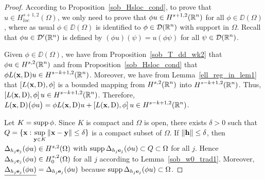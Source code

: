 \begin{proof}
According to Proposition~\ref{sob_Hsloc_cond}, to prove that
$\displaystyle u \in H^{s+1,2}_{loc}(\Omega)$, we only need to prove that
$\displaystyle \phi u \in H^{s+1,2}(\mathbb{R}^n)$ for all $\phi\in \DD(\Omega)$,
where as usual $\phi \in \DD(\Omega)$ is identified to
$\displaystyle \phi \in \mathcal{D}(\mathbb{R}^n)$ with
support in $\Omega$.  Recall that $\phi  u \in \mathcal{D}'(\mathbb{R}^n)$ is
defined by $(\phi u)(\psi) = u(\phi \psi)$ for all
$\displaystyle \psi \in \mathcal{D}(\mathbb{R}^n)$.

Given $\phi \in \DD(\Omega)$, we have from
Proposition~\ref{sob_T_dd_wk2} that $\displaystyle \phi u \in H^{s,2}(\mathbb{R}^n)$
and from Proposition~\ref{sob_Hsloc_cond} that
$\displaystyle \phi L(\mathbf{x},\operatorname{D}) u \in H^{s-k+1,2}(\mathbb{R}^n)$.
Moreover, we have from Lemma~\ref{ell_reg_in_lem1}
that $\left[ L(\mathbf{x},\operatorname{D}), \phi\right]$ is a bounded mapping from
$\displaystyle H^{s,2}(\mathbb{R}^n)$ into $\displaystyle H^{s-k+1,2}(\mathbb{R}^n)$.
Thus,
$\displaystyle \left[ L(\mathbf{x},\operatorname{D}), \phi\right]u \in H^{s-k+1,2}(\mathbb{R}^n)$.
Therefore,
$\displaystyle L(\mathbf{x},\operatorname{D}) \big(\phi u\big) = \phi L(\mathbf{x}, \operatorname{D}) u +
\left[ L(\mathbf{x},\operatorname{D}), \phi\right] u \in H^{s-k+1,2}(\mathbb{R}^n)$.

Let $K = \operatorname{supp} \phi$.  Since $K$ is compact and $\Omega$ is open, there
exists $\delta >0$ such that
$\displaystyle Q = \{ \mathbf{x} :
\sup_{\mathbf{y} \in K} \|\mathbf{x} -\mathbf{y}\|\leq \delta \}$
is a compact subset of $\Omega$.  If $\|\mathbf{h}\| \leq \delta$, then
$\Delta_{h_j\mathbf{e}_j} (\phi u) \in H^{s,2}(\Omega)$
with $\operatorname{supp} \Delta_{h_j\mathbf{e}_j} (\phi u) \subset Q
\subset \Omega$ for all $j$.  Hence
$\Delta_{h_j\mathbf{e}_j} (\phi u) \in H^{s,2}_0(\Omega)$
for all $j$ according to Lemma~\ref{sob_w0_trad1}.  Moreover,
$\underline{\Delta_{h_j\mathbf{e}_j} (\phi u)}
= \Delta_{h_j\mathbf{e}_j} (\phi u)$ because
$\operatorname{supp} \Delta_{h_j\mathbf{e}_j} (\phi u)\subset \Omega$.


\end{proof}
